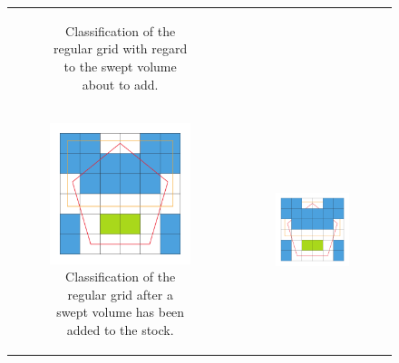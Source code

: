 \begin{figure}[!h]
\begin{tabular}{cc}
\begin{subfigure}[t]{0.3\textwidth}
			\caption{Classification of the regular grid with regard to the swept volume about to add.}
			\label{fig:classification_sv}
		\end{subfigure}\\
		\begin{subfigure}[t]{0.3\textwidth}
			\centering
			\includegraphics[width=\textwidth]{images/classification_after}
			\caption{Classification of the regular grid after a swept volume has been added to the stock.}
			\label{fig:classification_after}
		\end{subfigure}&
		\begin{subfigure}[t]{0.3\textwidth}
			\centering
			\includegraphics[width=\textwidth]{images/classification_after_removal}

\end{subfigure}
\end{tabular}
\end{figure}
